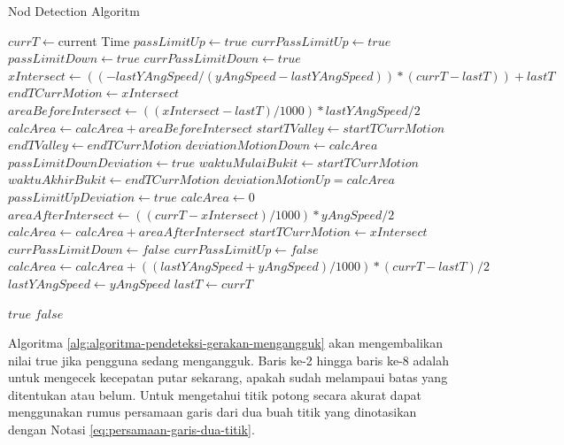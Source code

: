 \begin{algorithm}
	\caption{Nod Detection Algoritm}
	\label{alg:algoritma-pendeteksi-gerakan-mengangguk}
	\begin{algorithmic}[1]
		\State $currT \gets $current Time 
			\State $passLimitUp \gets true$
			\State $currPassLimitUp \gets true$
			\State $passLimitDown \gets true$
			\State $currPassLimitDown \gets true$
		\EndIf
			\State $xIntersect \gets ((-lastYAngSpeed / (yAngSpeed - lastYAngSpeed)) * (currT - lastT))+lastT$
			\State $endTCurrMotion \gets xIntersect$
			\State $areaBeforeIntersect \gets ((xIntersect - lastT) / 1000) * lastYAngSpeed / 2$
			\State $calcArea \gets calcArea + areaBeforeIntersect$
				\State $startTValley \gets startTCurrMotion$
				\State $endTValley \gets endTCurrMotion$
				\State $deviationMotionDown \gets calcArea$
					\State $passLimitDownDeviation \gets true$
				\EndIf
				\State $waktuMulaiBukit \gets startTCurrMotion$
				\State $waktuAkhirBukit \gets endTCurrMotion$
				\State $deviationMotionUp = calcArea$
					\State $passLimitUpDeviation \gets true$
				\EndIf
			\EndIf
			\State $calcArea \gets 0$
			\State $areaAfterIntersect \gets ((currT - xIntersect) / 1000) * yAngSpeed / 2$ 
			\State $calcArea \gets calcArea + areaAfterIntersect$ 
			\State $startTCurrMotion \gets xIntersect$ 
			\State $currPassLimitDown \gets false$ 
			\State $currPassLimitUp \gets false$ 
		\Else 
			\State $calcArea \gets calcArea + ((lastYAngSpeed + yAngSpeed) / 1000) * (currT - lastT) / 2$
		\EndIf
		\State $lastYAngSpeed \gets yAngSpeed$
		\State $lastT \gets currT$
		
			\Return $true$
		\Else
			\Return $false$
		\EndIf
	\EndFunction  
	\end{algorithmic}
\end{algorithm}

Algoritma \ref{alg:algoritma-pendeteksi-gerakan-mengangguk} akan mengembalikan nilai true jika pengguna sedang mengangguk. Baris ke-2 hingga baris ke-8 adalah untuk mengecek kecepatan putar sekarang, apakah sudah melampaui batas yang ditentukan atau belum. Untuk mengetahui titik potong secara akurat dapat menggunakan rumus persamaan garis dari dua buah titik yang dinotasikan dengan Notasi \ref{eq:persamaan-garis-dua-titik}.   

